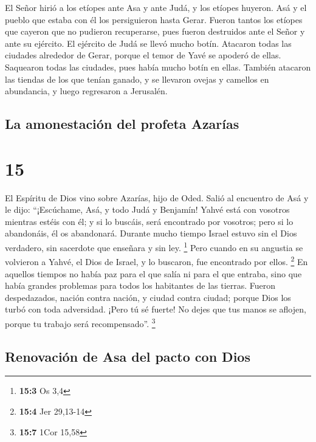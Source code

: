  El Señor hirió a los etíopes ante Asa y ante Judá, y los
etíopes huyeron.  Asá y el pueblo que estaba con él los
persiguieron hasta Gerar. Fueron tantos los etíopes que cayeron que no
pudieron recuperarse, pues fueron destruidos ante el Señor y ante su
ejército. El ejército de Judá se llevó mucho botín. 
Atacaron todas las ciudades alrededor de Gerar, porque el temor de Yavé
se apoderó de ellas. Saquearon todas las ciudades, pues había mucho
botín en ellas.  También atacaron las tiendas de los que
tenían ganado, y se llevaron ovejas y camellos en abundancia, y luego
regresaron a Jerusalén.

\hypertarget{la-amonestaciuxf3n-del-profeta-azaruxedas}{%
\subsection{La amonestación del profeta
Azarías}\label{la-amonestaciuxf3n-del-profeta-azaruxedas}}

\hypertarget{section-14}{%
\section{15}\label{section-14}}

 El Espíritu de Dios vino sobre Azarías, hijo de Oded.
 Salió al encuentro de Asá y le dijo: ``¡Escúchame, Asá, y
todo Judá y Benjamín! Yahvé está con vosotros mientras estéis con él; y
si lo buscáis, será encontrado por vosotros; pero si lo abandonáis, él
os abandonará.  Durante mucho tiempo Israel estuvo sin el
Dios verdadero, sin sacerdote que enseñara y sin ley. \footnote{\textbf{15:3}
  Os 3,4}  Pero cuando en su angustia se volvieron a
Yahvé, el Dios de Israel, y lo buscaron, fue encontrado por ellos.
\footnote{\textbf{15:4} Jer 29,13-14}  En aquellos tiempos
no había paz para el que salía ni para el que entraba, sino que había
grandes problemas para todos los habitantes de las tierras.
 Fueron despedazados, nación contra nación, y ciudad
contra ciudad; porque Dios los turbó con toda adversidad. 
¡Pero tú sé fuerte! No dejes que tus manos se aflojen, porque tu trabajo
será recompensado''. \footnote{\textbf{15:7} 1Cor 15,58}

\hypertarget{renovaciuxf3n-de-asa-del-pacto-con-dios}{%
\subsection{Renovación de Asa del pacto con
Dios}\label{renovaciuxf3n-de-asa-del-pacto-con-dios}}

